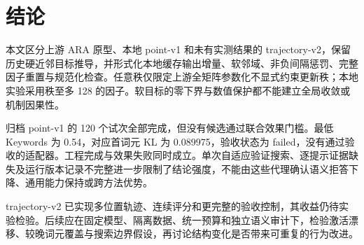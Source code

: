 \section{结论}
\label{sec:conclusion}

本文区分上游 ARA 原型、本地 point-v1 和未有实测结果的 trajectory-v2，保留历史硬近邻目标推导，并形式化本地缓存输出增量、软邻域、非负间隔惩罚、完整因子重置与规范化检查。任意秩仅限定上游全矩阵参数化不显式约束更新秩；本地实验采用秩至多 128 的因子。软目标的零下界与数值保护都不能建立全局收敛或机制因果性。

归档 point-v1 的 120 个试次全部完成，但没有候选通过联合效果门槛。最低 Keywords 为 0.54，对应首词元 KL 为 0.089975，验收状态为 failed，没有通过验收的适配器。工程完成与效果失败同时成立。单次自适应验证搜索、逐提示证据缺失及运行版本记录不完整进一步限制了结论强度，不能由这些代理确认语义拒答下降、通用能力保持或跨方法优势。

trajectory-v2 已实现多位置轨迹、连续评分和更完整的验收控制，其收益仍待实验检验。后续应在固定模型、隔离数据、统一预算和独立语义审计下，检验激活漂移、较晚词元覆盖与搜索边界假设，再讨论结构变化是否带来可重复的行为改进。
